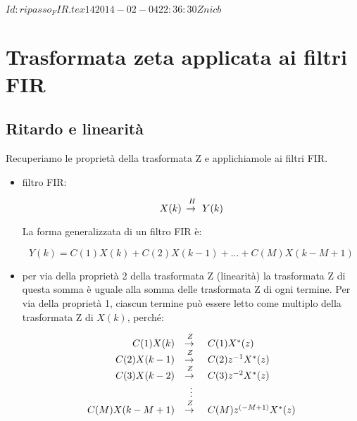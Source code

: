 %
%
\svnInfo $Id: ripasso_FIR.tex 14 2014-02-04 22:36:30Z nicb $

\section{Trasformata zeta applicata ai filtri FIR\label{sec:zeta fir}}

\subsection{Ritardo e linearit\`a\label{sec:ritardo e linearita}}

Recuperiamo le propriet\`a della trasformata Z e applichiamole ai filtri FIR.

\begin{itemize}

\item filtro FIR:
				
		\begin{equation}
			X(k)\,\raiseto{H}\,Y(k)
		\end{equation}

		La forma generalizzata di un filtro FIR \`e:
  
		\begin{equation}
    	Y(k) = C(1)X(k) + C(2)X(k-1) + ... + C(M)X(k-M+1)
		\end{equation}

\item per via della propriet\`a 2 della trasformata Z (linearit\`a) la trasformata Z di questa somma
     \`e uguale alla somma delle trasformata Z di ogni termine. Per via della propriet\`a
     1, ciascun termine pu\`o essere letto come multiplo della trasformata Z di $X(k)$,
     perch\'e:
 
		 \begin{equation}
			 \begin{array}{r c l}
						 C(1)X(k) & \raiseto{Z} & C(1)X^{*}(z)\\
						 C(2)X(k-1) & \raiseto{Z} & C(2)z^{-1}X^{*}(z)\\
						 C(3)X(k-2) & \raiseto{Z} & C(3)z^{-2}X^{*}(z)\\
						            & \vdots & \\
						 C(M)X(k-M+1) & \raiseto{Z} & C(M)z^{(-M+1)}X^{*}(z)\\
		    \end{array}
		 \end{equation}
 

\end{itemize}
